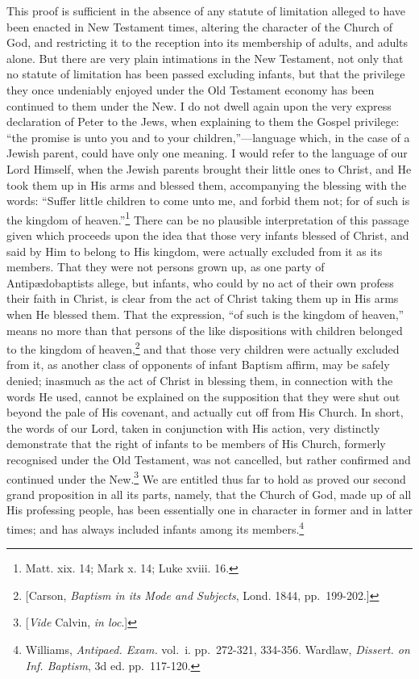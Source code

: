 \documentclass[]{book}
\begin{document}
This proof is sufficient in the absence of any statute of limitation alleged to have been enacted in New Testament times, altering the character of the Church of God, and restricting it to the reception into its membership of adults, and adults alone. But there are very plain intimations in the New Testament, not only that no statute of limitation has been passed excluding infants, but that the privilege they once undeniably enjoyed under the Old Testament economy has been continued to them under the New. I do not dwell again upon the very express declaration of Peter to the Jews, when explaining to them the Gospel privilege: ``the promise is unto you and to your children,''---language which, in the case of a Jewish parent, could have only one meaning. I would refer to the language of our Lord Himself, when the Jewish parents brought their little ones to Christ, and He took them up in His arms and blessed them, accompanying the blessing with the words: ``Suffer little children to come unto me, and forbid them not; for of such is the kingdom of heaven.''\footnote{Matt. xix. 14; Mark x. 14; Luke xviii. 16.} There can be no plausible interpretation of this passage given which proceeds upon the idea that those very infants blessed of Christ, and said by Him to belong to His kingdom, were actually excluded from it as its members. That they were not persons grown up, as one party of Antipædobaptists allege, but infants, who could by no act of their own profess their faith in Christ, is clear from the act of Christ taking them up in His arms when He blessed them. That the expression, ``of such is the kingdom of heaven,'' means no more than that persons of the like dispositions with children belonged to the kingdom of heaven,\footnote{{[}Carson, \emph{Baptism in its Mode and Subjects}, Lond. 1844, pp.~199-202.{]}} and that those very children were actually excluded from it, as another class of opponents of infant Baptism affirm, may be safely denied; inasmuch as the act of Christ in blessing them, in connection with the words He used, cannot be explained on the supposition that they were shut out beyond the pale of His covenant, and actually cut off from His Church. In short, the words of our Lord, taken in conjunction with His action, very distinctly demonstrate that the right of infants to be members of His Church, formerly recognised under the Old Testament, was not cancelled, but rather confirmed and continued under the New.\footnote{{[}\emph{Vide} Calvin, \emph{in loc}.{]}} We are entitled thus far to hold as proved our second grand proposition in all its parts, namely, that the Church of God, made up of all His professing people, has been essentially one in character in former and in latter times; and has always included infants among its members.\footnote{Williams, \emph{Antipaed. Exam.} vol.~i. pp.~272-321, 334-356. Wardlaw, \emph{Dissert. on Inf. Baptism}, 3d ed. pp.~117-120.}
\end{document}
